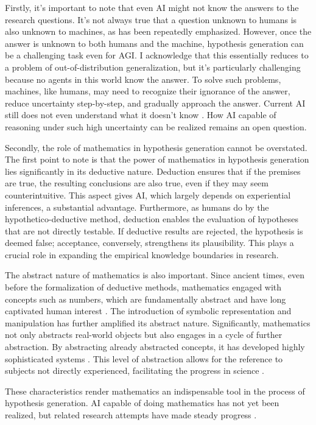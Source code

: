 \documentclass{article}
\begin{document}
Firstly, it's important to note that even AI might not know the answers to the research questions. It's not always true that a question unknown to humans is also unknown to machines, as has been repeatedly emphasized. However, once the answer is unknown to both humans and the machine, hypothesis generation can be a challenging task even for AGI. I acknowledge that this essentially  reduces to a problem of out-of-distribution generalization, but it's particularly challenging because no agents in this world know the answer. To solve such problems, machines, like humans, may need to recognize their ignorance of the answer, reduce uncertainty step-by-step, and gradually approach the answer. Current AI still does not even understand what it doesn't know \cite{guo2017calibration,maynez2020faithfulness}. How AI capable of reasoning under such high uncertainty can be realized remains an open question.

Secondly, the role of mathematics in hypothesis generation cannot be overstated. The first point to note is that the power of mathematics in hypothesis generation lies significantly in its deductive nature. Deduction ensures that if the premises are true, the resulting conclusions are also true, even if they may seem counterintuitive. This aspect gives AI, which largely depends on experiential inferences, a substantial advantage. Furthermore, as humans do by the hypothetico-deductive method, deduction enables the evaluation of hypotheses that are not directly testable. If deductive results are rejected, the hypothesis is deemed false; acceptance, conversely, strengthens its plausibility. This plays a crucial role in expanding the empirical knowledge boundaries in research. 

The abstract nature of mathematics is also important. Since ancient times, even before the formalization of deductive methods, mathematics engaged with concepts such as numbers, which are fundamentally abstract and have long captivated human interest \cite{david2010history}. The introduction of symbolic representation and manipulation has further amplified its abstract nature. Significantly, mathematics not only abstracts real-world objects but also engages in a cycle of further abstraction. By abstracting already abstracted concepts, it has developed highly sophisticated systems \cite{bochner1968role}. This level of abstraction allows for the reference to subjects not directly experienced, facilitating the progress in science \cite{heisenberg2008abstraction}. 

These characteristics render mathematics an indispensable tool in the process of hypothesis generation. AI capable of doing mathematics has not yet been realized, but related research attempts have made steady progress \cite{rabe2021towards,liu2023mathematicallm,romeraparedes2023}.
\end{document}
